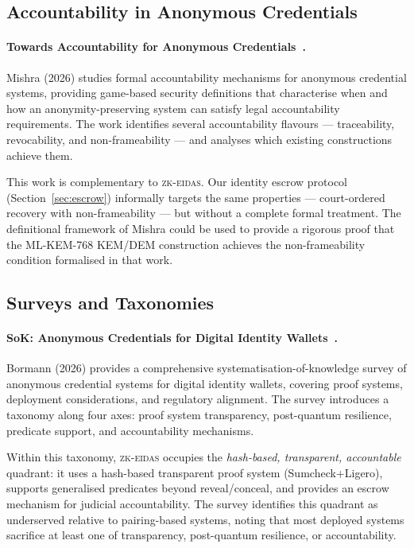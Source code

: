 \subsection{Accountability in Anonymous Credentials}\label{sec:rel-accountability}

\paragraph{Towards Accountability for Anonymous Credentials~\cite{accountability-ac}.}
Mishra (2026) studies formal accountability mechanisms for anonymous
credential systems, providing game-based security definitions that
characterise when and how an anonymity-preserving system can satisfy legal
accountability requirements.  The work identifies several
accountability flavours --- traceability, revocability, and
non-frameability --- and analyses which existing constructions achieve
them.

This work is complementary to \textsc{zk-eidas}.  Our identity escrow
protocol (Section~\ref{sec:escrow}) informally targets the same properties
--- court-ordered recovery with non-frameability --- but without a
complete formal treatment.  The definitional framework of Mishra could be
used to provide a rigorous proof that the ML-KEM-768 KEM/DEM construction
achieves the non-frameability condition formalised in that work.

\subsection{Surveys and Taxonomies}\label{sec:rel-surveys}

\paragraph{SoK: Anonymous Credentials for Digital Identity Wallets~\cite{sok-ac}.}
Bormann (2026) provides a comprehensive systematisation-of-knowledge
survey of anonymous credential systems for digital identity wallets,
covering proof systems, deployment considerations, and regulatory
alignment.  The survey introduces a taxonomy along four axes:
proof system transparency, post-quantum resilience, predicate support,
and accountability mechanisms.

Within this taxonomy, \textsc{zk-eidas} occupies the
\emph{hash-based, transparent, accountable} quadrant: it uses a
hash-based transparent proof system (Sumcheck+Ligero), supports
generalised predicates beyond reveal/conceal, and provides an escrow
mechanism for judicial accountability.  The survey identifies this
quadrant as underserved relative to pairing-based systems, noting that
most deployed systems sacrifice at least one of transparency,
post-quantum resilience, or accountability.


